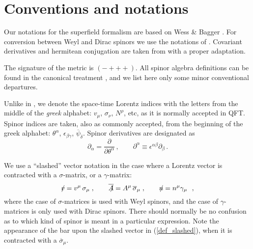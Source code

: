 \documentclass[paper,12pt]{revtex4}
\newcommand{\slashed}[1]{\hbox{{$#1$}\llap{$/$}}}
\begin{document}



\appendix
\section{Conventions and notations}
\label{app_conventions}

	Our notations for the superfield formalism are based on 
	Wess \& Bagger 
\cite{Wess:1992cp}.
	For conversion between Weyl and Dirac spinors we use the notations
	of 
\cite{Martin:1997ns}.
	Covariant derivatives and hermitean conjugation are taken from
\cite{Gates:1983nr}
	with a proper adaptation.

	The signature of the metric is 
$ (-+++) $.
	All spinor algebra definitions can be found in the canonical treatment
\cite{Wess:1992cp},
	and we list here only some minor conventional departures.

	Unlike in \cite{Wess:1992cp}, we denote the space-time Lorentz
	indices with the letters from the middle of the \emph{greek}
	alphabet:
	$ v_\mu $, $ \sigma_\nu $, $ N^\rho $, etc,
	as it is normally accepted in QFT.
	Spinor indices are taken, also as commonly accepted, from the
	beginning of the greek alphabet:
	$ \theta^\alpha $, $ \epsilon_{\beta\gamma} $, 
	$ \overline{\psi}_{\dot\delta}$.
	Spinor derivatives are designated as
\[
	\partial_\alpha = \frac{\partial}{\partial\theta^\alpha}\,,
	\qquad
	\partial^\alpha \equiv \epsilon^{\alpha\beta}\partial_\beta
	\,.
\]

	We use a ``slashed'' vector notation in the case where a Lorentz
	vector is contracted with a $ \sigma $-matrix, or a $ \gamma $-matrix:
\begin{equation}
\label{def_slashed}
	\slashed{v} = v^\mu\, \sigma_\mu\;, \qquad
	\overline{\slashed{A}} = A^\mu\, \overline{\sigma}_\mu\;, \qquad
	\slashed{n} = n^\mu \gamma_\mu~~,
\end{equation}
	where the case of $ \sigma $-matrices is used with Weyl spinors, and
	the case of $ \gamma $-matrices is only used with Dirac spinors. 
	There should normally be no confusion as to which kind of spinor is
	meant in a particular expression.
	Note the appearance of the bar upon the slashed vector in
	(\ref{def_slashed}), when it
	is contracted with a $ \overline{\sigma}_\mu $.
\end{document}
